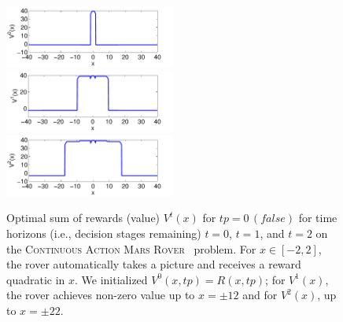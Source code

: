 \documentclass[twoside,11pt]{article}
\newcommand{\MarsRover}{\textsc{Mars Rover }}
\newcommand{\false}{\mathit{false}}
\begin{document}
\begin{figure}[t!]
\centering
\begin{minipage}[b]{1\linewidth}
\includegraphics[width=0.5\textwidth]{pics/v1_2d.pdf}
\includegraphics[width=0.5\textwidth]{pics/v2_2d.pdf}\\
\includegraphics[width=0.5\textwidth]{pics/v3_2d.pdf}

\caption{Optimal sum of rewards (value) 
$V^t(x)$ for $tp = 0 \, 
(\false)$ for time horizons (i.e., decision stages remaining) $t=0$,
$t=1$, and $t=2$ on the \textsc{Continuous Action}  \MarsRover\ problem.  For $x \in [-2,2]$, the
rover automatically takes a picture and receives a reward quadratic in
$x$.  We initialized $V^0(x,tp) = R(x,tp)$; for $V^1(x)$, the rover achieves
non-zero value up to $x = \pm 12$ and for 
$V^2(x)$, up to $x = \pm 22$.}
\label{fig:opt_graph}

\end{minipage}
\end{figure}
\end{document}

